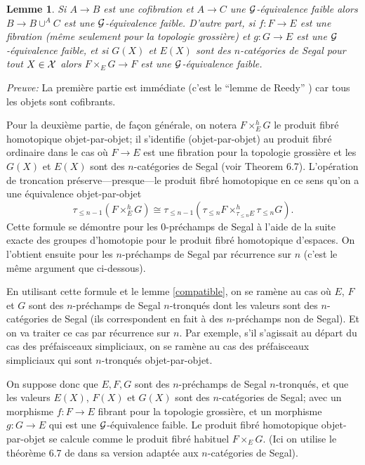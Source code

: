 \documentclass[12pt]{article}
\newtheorem{lemme}[lemma]{Lemme}
\newcommand{\Gg}{{\cal G}}
\newcommand{\Xx}{{\cal X}}
\begin{document}
\begin{lemme}
\label{proper}
Si $A\rightarrow B$ est une cofibration et $A\rightarrow C$ une
$\Gg$-\'equivalence faible alors $B\rightarrow B\cup ^AC$ est une
$\Gg$-\'equivalence
faible. D'autre part, si $f:F\rightarrow E$ est une fibration (m\^eme seulement
pour la topologie grossi\`ere) et $g:G\rightarrow E$ est une $\Gg$-\'equivalence
faible, et si $G(X)$ et $E(X)$ sont des $n$-cat\'egories de Segal pour tout
$X\in
\Xx$ alors $F\times _EG\rightarrow F$ est une $\Gg$-\'equivalence faible.
\end{lemme}
{\em Preuve:}
La premi\`ere partie est imm\'ediate (c'est le ``lemme de Reedy''
\cite{Reedy} \cite{DHK} \cite{Hirschhorn}) car tous les objets sont cofibrants.

Pour la deuxi\`eme partie, de fa\c{c}on g\'en\'erale, on notera
$F\times ^h_EG$ le produit fibr\'e homotopique objet-par-objet; il
s'identifie (objet-par-objet)
au produit fibr\'e ordinaire dans le cas o\`u
$F\rightarrow E$ est une fibration pour la topologie
grossi\`ere et les $G(X)$ et $E(X)$ sont des $n$-cat\'egories de Segal (voir
\cite{nCAT} Theorem 6.7).
L'op\'eration de troncation pr\'eserve---presque---le
produit fibr\'e homotopique en ce sens qu'on a une \'equivalence
objet-par-objet
$$
\tau _{\leq n-1} (F\times ^h _EG) \cong
\tau _{\leq n-1}\left( \tau _{\leq n}F\times ^h _{\tau _{\leq n}E}\tau
_{\leq n}G
\right) .
$$
Cette formule se d\'emontre pour les $0$-pr\'echamps de Segal
\`a l'aide de la suite exacte
des groupes d'homotopie pour le produit fibr\'e homotopique d'espaces. On
l'obtient ensuite pour les $n$-pr\'echamps de Segal par r\'ecurrence sur
$n$ (c'est le
m\^eme argument que ci-dessous).


En utilisant cette formule et le lemme
\ref{compatible}, on se ram\`ene au cas o\`u $E$, $F$
et $G$ sont des $n$-pr\'echamps de Segal $n$-tronqu\'es dont les valeurs
sont des
$n$-cat\'egories de Segal (ils correspondent en fait \`a des
$n$-pr\'echamps non de
Segal). Et on va traiter ce cas par r\'ecurrence sur $n$. Par exemple, s'il
s'agissait au d\'epart du cas des pr\'efaisceaux simpliciaux, on se ram\`ene au
cas des pr\'efaisceaux simpliciaux qui sont $n$-tronqu\'es objet-par-objet.


On suppose donc que $E,F,G$ sont des $n$-pr\'echamps de Segal $n$-tronqu\'es,
et que les valeurs $E(X)$, $F(X)$ et $G(X)$ sont des $n$-cat\'egories de Segal;
avec un morphisme $f: F\rightarrow E$ fibrant pour la topologie grossi\`ere,
et un morphisme $g: G\rightarrow E$ qui est une $\Gg$-\'equivalence faible.
Le produit fibr\'e homotopique objet-par-objet se calcule comme le produit
fibr\'e habituel $F\times _EG$. (Ici on utilise le th\'eor\`eme 6.7 de
\cite{nCAT}
dans sa version adapt\'ee aux $n$-cat\'egories de Segal).
\end{document}
